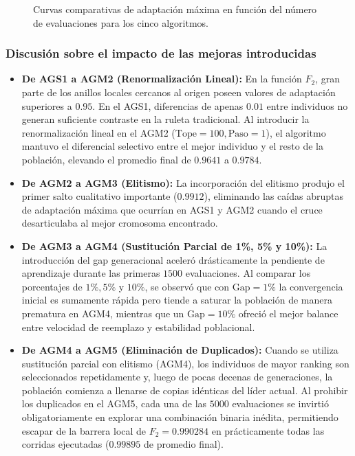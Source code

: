\documentclass[11pt,letterpaper]{article}
\begin{document}
\begin{figure}[H]
    \centering
    \caption{Curvas comparativas de adaptación máxima en función del número de evaluaciones para los cinco algoritmos.}
    \label{fig:exp2_5algs}
\end{figure}

\subsubsection*{Discusión sobre el impacto de las mejoras introducidas}
\begin{itemize}
    \item \textbf{De AGS1 a AGM2 (Renormalización Lineal):} En la función $F_2$, gran parte de los anillos locales cercanos al origen poseen valores de adaptación superiores a $0.95$. En el AGS1, diferencias de apenas $0.01$ entre individuos no generan suficiente contraste en la ruleta tradicional. Al introducir la renormalización lineal en el AGM2 ($\text{Tope}=100, \text{Paso}=1$), el algoritmo mantuvo el diferencial selectivo entre el mejor individuo y el resto de la población, elevando el promedio final de $0.9641$ a $0.9784$.
    \item \textbf{De AGM2 a AGM3 (Elitismo):} La incorporación del elitismo produjo el primer salto cualitativo importante ($0.9912$), eliminando las caídas abruptas de adaptación máxima que ocurrían en AGS1 y AGM2 cuando el cruce desarticulaba al mejor cromosoma encontrado.
    \item \textbf{De AGM3 a AGM4 (Sustitución Parcial de 1\%, 5\% y 10\%):} La introducción del gap generacional aceleró drásticamente la pendiente de aprendizaje durante las primeras $1500$ evaluaciones. Al comparar los porcentajes de $1\%, 5\%$ y $10\%$, se observó que con $\text{Gap} = 1\%$ la convergencia inicial es sumamente rápida pero tiende a saturar la población de manera prematura en AGM4, mientras que un $\text{Gap} = 10\%$ ofreció el mejor balance entre velocidad de reemplazo y estabilidad poblacional.
    \item \textbf{De AGM4 a AGM5 (Eliminación de Duplicados):} Cuando se utiliza sustitución parcial con elitismo (AGM4), los individuos de mayor ranking son seleccionados repetidamente y, luego de pocas decenas de generaciones, la población comienza a llenarse de copias idénticas del líder actual. Al prohibir los duplicados en el AGM5, cada una de las $5000$ evaluaciones se invirtió obligatoriamente en explorar una combinación binaria inédita, permitiendo escapar de la barrera local de $F_2 = 0.990284$ en prácticamente todas las corridas ejecutadas ($0.99895$ de promedio final).
\end{itemize}
\end{document}
